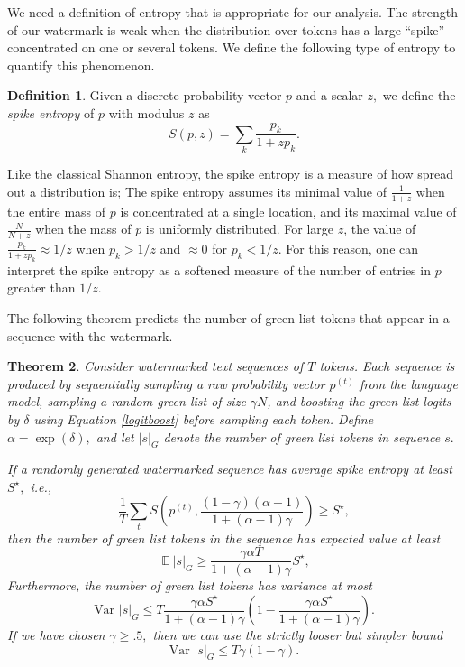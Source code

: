 \documentclass{article}
\theoremstyle{plain}
\newtheorem{theorem}{Theorem}[section]
\theoremstyle{definition}
\newtheorem{definition}[theorem]{Definition}
\theoremstyle{remark}
\DeclareMathOperator*{\expect}{\mathbb{E}}
\begin{document}
We need a definition of entropy that is appropriate for our analysis.  The strength of our watermark is weak when the distribution over tokens has a large ``spike'' concentrated on one or several tokens. We define the following type of entropy to quantify this phenomenon.
\begin{definition}
Given a discrete probability vector $p$ and a scalar $z,$ we define the {\em spike entropy} of $p$ with modulus $z$ as
 $$S(p,z) = \sum_k \frac{p_k}{1+zp_k}.$$
\end{definition}
Like the classical Shannon entropy, the spike entropy is a measure of how spread out a distribution is; The spike entropy assumes its minimal value of $\frac{1}{1+z}$  when the entire mass of $p$ is concentrated at a single location, and its maximal value of $\frac{N}{N+z}$ when the mass of $p$ is uniformly distributed. 
For large $z$, the value of $\frac{p_k}{1+zp_k} \approx 1/z$ when $p_k>1/z$ and $\approx 0$ for $p_k < 1/z.$ For this reason, one can interpret the spike entropy as a softened measure of the number of entries in $p$ greater than  $1/z.$ 







The following theorem predicts the number of green list tokens that appear in a sequence with the watermark.

\begin{theorem} \label{maintheorem}
Consider watermarked text sequences of $T$ tokens. Each sequence is produced by sequentially sampling a raw probability vector $p^{(t)}$ from the language model, sampling a random green list of size $\gamma N$, and boosting the green list logits by $\delta$ using Equation \ref{logitboost} before sampling each token.  Define $\alpha = \exp(\delta),$ and let $|s|_G$ denote the number of green list tokens in sequence $s.$

If a randomly generated watermarked sequence has average spike entropy at least $S^\star,$ i.e.,
   $$ \frac{1}{T} \sum_t S\left(p^{(t)},\frac{(1-\gamma)(\alpha - 1)}{ 1+(\alpha-1)\gamma}\right) \ge S^\star,$$
then the number of green list tokens in the sequence has expected value at least
   $$ \expect |s|_G  \ge \frac{\gamma\alpha T}{ 1+(\alpha-1)\gamma} S^\star,$$
 Furthermore, the number of green list tokens has variance at most
  $$ \text{Var}\,\, |s|_G \le T \frac{\gamma\alpha S^\star}{ 1+(\alpha-1)\gamma}  \left(1-\frac{\gamma\alpha S^\star}{ 1+(\alpha-1)\gamma} \right).$$
  If we have chosen $\gamma\ge .5,$ then we can use the strictly looser but simpler bound 
  $$ \text{Var}\,\, |s|_G  \le T\gamma (1-\gamma).$$
\end{theorem}
\end{document}
